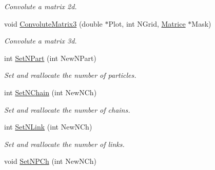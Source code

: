 \begin{DoxyCompactItemize}
\begin{DoxyCompactList}\small\item\em \-Convolute a matrix 2d. \end{DoxyCompactList}\item 
\hypertarget{classVarData_a1a475106efeb1fdfddaed3f6a069d199}{void \hyperlink{classVarData_a1a475106efeb1fdfddaed3f6a069d199}{\-Convolute\-Matrix3} (double $\ast$\-Plot, int \-N\-Grid, \hyperlink{classMatrice}{\-Matrice} $\ast$\-Mask)}\label{classVarData_a1a475106efeb1fdfddaed3f6a069d199}

\begin{DoxyCompactList}\small\item\em \-Convolute a matrix 3d. \end{DoxyCompactList}\item 
\hypertarget{classVarData_a2e0b2cd0414a0994122e1dfae41e57b8}{int \hyperlink{classVarData_a2e0b2cd0414a0994122e1dfae41e57b8}{\-Set\-N\-Part} (int \-New\-N\-Part)}\label{classVarData_a2e0b2cd0414a0994122e1dfae41e57b8}

\begin{DoxyCompactList}\small\item\em \-Set and reallocate the number of particles. \end{DoxyCompactList}\item 
\hypertarget{classVarData_a868e00b8cdabb8ea14fcec15942725ae}{int \hyperlink{classVarData_a868e00b8cdabb8ea14fcec15942725ae}{\-Set\-N\-Chain} (int \-New\-N\-Ch)}\label{classVarData_a868e00b8cdabb8ea14fcec15942725ae}

\begin{DoxyCompactList}\small\item\em \-Set and reallocate the number of chains. \end{DoxyCompactList}\item 
\hypertarget{classVarData_a1bc126dbe2154d5966e5d2c57af9c7c8}{int \hyperlink{classVarData_a1bc126dbe2154d5966e5d2c57af9c7c8}{\-Set\-N\-Link} (int \-New\-N\-Ch)}\label{classVarData_a1bc126dbe2154d5966e5d2c57af9c7c8}

\begin{DoxyCompactList}\small\item\em \-Set and reallocate the number of links. \end{DoxyCompactList}\item 
\hypertarget{classVarData_a3e021ffdb31d5f94a22435e437dc6972}{void \hyperlink{classVarData_a3e021ffdb31d5f94a22435e437dc6972}{\-Set\-N\-P\-Ch} (int \-New\-N\-Ch)}\label{classVarData_a3e021ffdb31d5f94a22435e437dc6972}


\end{DoxyCompactItemize}
